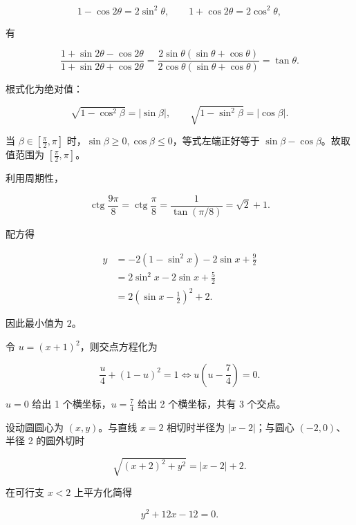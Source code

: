 \begin{answer}
\nopagebreak[4]
\[
1-\cos2\theta=2\sin^2\theta,\qquad
1+\cos2\theta=2\cos^2\theta,
\]

有

\nopagebreak[4]
\[
\frac{1+\sin2\theta-\cos2\theta}
{1+\sin2\theta+\cos2\theta}
=\frac{2\sin\theta(\sin\theta+\cos\theta)}
{2\cos\theta(\sin\theta+\cos\theta)}
=\tan\theta.
\]


根式化为绝对值：

\nopagebreak[4]
\[
\sqrt{1-\cos^2\beta}=|\sin\beta|,
\qquad
\sqrt{1-\sin^2\beta}=|\cos\beta|.
\]

当 $\beta\in[\frac\pi2,\pi]$ 时，$\sin\beta\ge0,\cos\beta\le0$，等式左端正好等于 $\sin\beta-\cos\beta$。故取值范围为 $[\frac\pi2,\pi]$。


利用周期性，

\nopagebreak[4]
\[
\operatorname{ctg}\frac{9\pi}{8}
=\operatorname{ctg}\frac\pi8
=\frac1{\tan(\pi/8)}
=\sqrt2+1.
\]


配方得

\nopagebreak[4]
\[
\begin{aligned}
y&=-2(1-\sin^2x)-2\sin x+\frac92\\
&=2\sin^2x-2\sin x+\frac52\\
&=2\left(\sin x-\frac12\right)^2+2.
\end{aligned}
\]

因此最小值为 $2$。


令 $u=(x+1)^2$，则交点方程化为

\nopagebreak[4]
\[
\frac u4+(1-u)^2=1
\Longleftrightarrow
u\left(u-\frac74\right)=0.
\]

$u=0$ 给出 1 个横坐标，$u=\frac74$ 给出 2 个横坐标，共有 3 个交点。


设动圆圆心为 $(x,y)$。与直线 $x=2$ 相切时半径为 $|x-2|$；与圆心 $(-2,0)$、半径 2 的圆外切时

\nopagebreak[4]
\[
\sqrt{(x+2)^2+y^2}=|x-2|+2.
\]

在可行支 $x<2$ 上平方化简得

\nopagebreak[4]
\[
y^2+12x-12=0.
\]


\end{answer}
